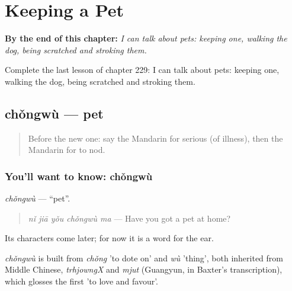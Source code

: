 
\chapter{Keeping a Pet}
\label{ch:zh-keeping-a-pet}

\begin{chapteropening}
\textbf{By the end of this chapter:} \emph{I can talk about pets: keeping one, walking the dog, being scratched and stroking them.}

Complete the last lesson of chapter 229: I can talk about pets: keeping one, walking the dog, being scratched and stroking them.
\end{chapteropening}

\section[chǒngwù]{chǒngwù — pet}

\label{lesson:ZH-C229-chongwu}



\begin{quote}
Before the new one: say the Mandarin for serious (of illness), then the Mandarin for to nod.
\end{quote}

\subsection*{You'll want to know: chǒngwù}
\emph{chǒngwù} — \textquotedblleft{}pet\textquotedblright{}.

\begin{quote}
\emph{nǐ jiā yǒu chǒngwù ma} — Have you got a pet at home?
\end{quote}

Its characters come later; for now it is a word for the ear.

\begin{cousinweb}
\emph{chǒngwù} is built from \emph{chǒng} 'to dote on' and \emph{wù} 'thing', both inherited from Middle Chinese, \emph{trhjowngX} and \emph{mjut} (Guangyun, in Baxter's transcription), which glosses the first 'to love and favour'.
\end{cousinweb}

